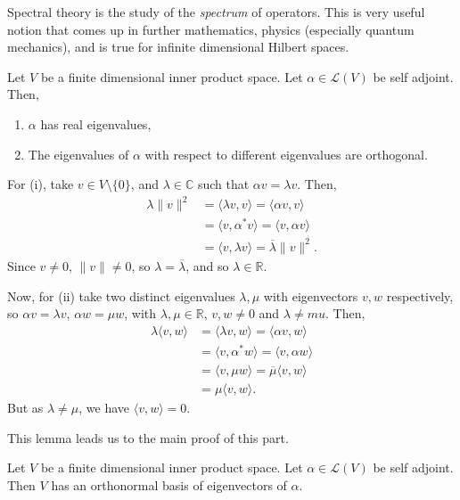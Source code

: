 \documentclass[12pt]{article}
\begin{document}
Spectral theory is the study of the \textit{spectrum} of operators. This is very useful notion that comes up in further mathematics, physics (especially quantum mechanics), and is true for infinite dimensional Hilbert spaces.

\begin{lemma}
	Let $V$ be a finite dimensional inner product space. Let $\alpha \in \mathcal{L}(V)$ be self adjoint. Then,
	\begin{enumerate}[\normalfont(i)]
		\item $\alpha$ has real eigenvalues,
		\item The eigenvalues of $\alpha$ with respect to different eigenvalues are orthogonal.
	\end{enumerate}
\end{lemma}

\begin{proofbox}
	For (i), take $v \in V \setminus \{0\}$, and $\lambda \in \mathbb{C}$ such that $\alpha v = \lambda v$. Then,
	\begin{align*}
		\lambda \|v\|^2 &= \langle \lambda v, v \rangle = \langle \alpha v, v \rangle \\
				&= \langle v, \alpha^{\ast} v \rangle = \langle v, \alpha v \rangle \\
				&= \langle v, \lambda v \rangle = \overline{\lambda} \|v\|^2.
	\end{align*}
	Since $v \neq 0$, $\|v\| \neq 0$, so $\lambda = \overline{\lambda}$, and so $\lambda \in \mathbb{R}$.

	Now, for (ii) take two distinct eigenvalues $\lambda, \mu$ with eigenvectors $v, w$ respectively, so $\alpha v = \lambda v$, $\alpha w = \mu w$, with $\lambda, \mu \in \mathbb{R}$, $v, w \neq 0$ and $\lambda \neq mu$. Then,
	\begin{align*}
		\lambda \langle v, w\rangle &= \langle \lambda v, w \rangle = \langle \alpha v , w \rangle \\
					    &= \langle v, \alpha^{\ast} w \rangle = \langle v, \alpha w \rangle \\
					    &= \langle v, \mu w \rangle = \overline{\mu}\langle v, w \rangle \\
					    &= \mu \langle v, w \rangle.
	\end{align*}
	But as $\lambda \neq \mu$, we have $\langle v, w \rangle = 0$.
\end{proofbox}

This lemma leads us to the main proof of this part.

\begin{theorem}
	Let $V$ be a finite dimensional inner product space. Let $\alpha \in \mathcal{L}(V)$ be self adjoint. Then $V$ has an orthonormal basis of eigenvectors of $\alpha$.
\end{theorem}
\end{document}
